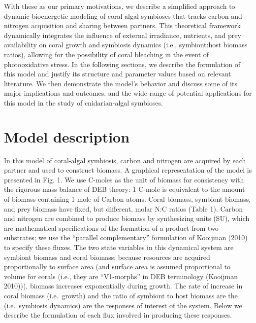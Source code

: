\documentclass[]{elsarticle} %
\begin{document}
With these as our primary motivations, we describe a simplified approach
to dynamic bioenergetic modeling of coral-algal symbioses that tracks
carbon and nitrogen acquisition and sharing between partners. This
theoretical framework dynamically integrates the influence of external
irradiance, nutrients, and prey availability on coral growth and
symbiosis dynamics (i.e., symbiont:host biomass ratios), allowing for
the possibility of coral bleaching in the event of photooxidative
stress. In the following sections, we describe the formulation of this
model and justify its structure and parameter values based on relevant
literature. We then demonstrate the model's behavior and discuss some of
its major implications and outcomes, and the wide range of potential
applications for this model in the study of cnidarian-algal symbioses.

\section{Model description}\label{model-description}

In this model of coral-algal symbiosis, carbon and nitrogen are acquired
by each partner and used to construct biomass. A graphical
representation of the model is presented in Fig. 1. We use C-moles as
the unit of biomass for consistency with the rigorous mass balance of
DEB theory: 1 C-mole is equivalent to the amount of biomass containing 1
mole of Carbon atoms. Coral biomass, symbiont biomass, and prey biomass
have fixed, but different, molar N:C ratios (Table 1). Carbon and
nitrogen are combined to produce biomass by synthesizing units (SU),
which are mathematical specifications of the formation of a product from
two substrates; we use the ``parallel complementary'' formulation of
Kooijman (2010) to specify these fluxes. The two state variables in this
dynamical system are symbiont biomass and coral biomass; because
resources are acquired proportionally to surface area (and surface area
is assumed proportional to volume for corals (i.e., they are
``V1-morphs'' in DEB terminology (Kooijman 2010))), biomass increases
exponentially during growth. The rate of increase in coral biomass
(i.e.~growth) and the ratio of symbiont to host biomass are the
(i.e.~symbiosis dynamics) are the responses of interest of the system.
Below we describe the formulation of each flux involved in producing
these responses.
\end{document}
